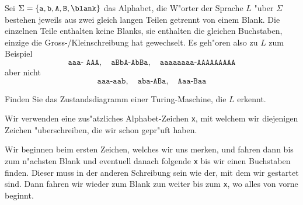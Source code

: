 Sei $\Sigma=\{\texttt{a},\texttt{b},\texttt{A},\texttt{B},\blank\}$
das Alphabet, die W"orter der Sprache $L$ "uber $\Sigma$ bestehen
jeweils aus zwei gleich langen Teilen getrennt von einem Blank.
Die einzelnen Teile enthalten keine Blanks,
sie enthalten die gleichen Buchstaben, einzige die
Gross-/Kleinschreibung hat gewechselt.
Es geh"oren also zu $L$ zum Beispiel
\[
\texttt{aaa- AAA},\quad
\texttt{aBbA-AbBa},\quad
\texttt{aaaaaaaa-AAAAAAAAA}
\]
aber nicht
\[
\texttt{aaa-aab},\quad
\texttt{aba-ABa},\quad
\texttt{Aaa-Baa}
\]

Finden Sie das Zustandsdiagramm einer Turing-Maschine, die $L$ erkennt.

\begin{loesung}
Wir verwenden eine zus"atzliches Alphabet-Zeichen \texttt{x}, mit welchem
wir diejenigen Zeichen "uberschreiben, die wir schon gepr"uft haben.

Wir beginnen beim ersten Zeichen, welches wir uns merken, und fahren
dann bis zum n"achsten Blank und eventuell danach folgende \texttt{x}
bis wir einen Buchstaben finden.
Dieser muss in der anderen Schreibung sein wie der, mit dem wir
gestartet sind.
Dann fahren wir wieder zum Blank zun weiter bis zum \texttt{x}, wo alles
von vorne beginnt.


\end{loesung}
